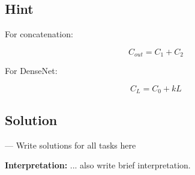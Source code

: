 \documentclass[11pt]{article}
\begin{document}
\subsection*{Hint}

For concatenation:

\[
C_{out}=C_1+C_2
\]

For DenseNet:

\[
C_L=C_0+kL
\]

\subsection*{Solution}

--- Write solutions for all tasks here 

\noindent \textbf{Interpretation:} ... also write brief interpretation.
\end{document}
